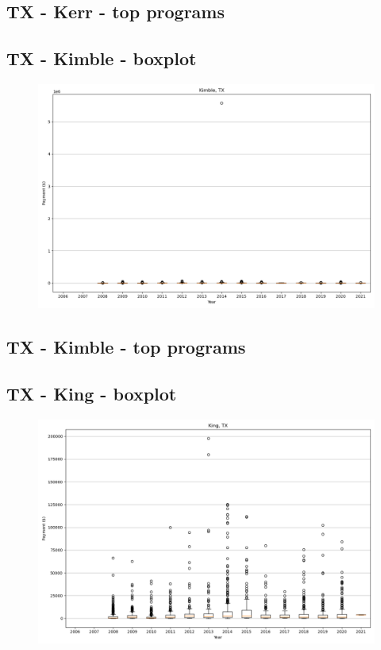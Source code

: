 \subsection*{TX - Kerr - top programs}

\newpage
\subsection*{TX - Kimble - boxplot}
\begin{figure}[h]
\centering
\includegraphics[width=7in]{../output/boxplots/counties/Kimble-TX_boxplot.png}
\end{figure}


\subsection*{TX - Kimble - top programs}

\newpage
\subsection*{TX - King - boxplot}
\begin{figure}[h]
\centering
\includegraphics[width=7in]{../output/boxplots/counties/King-TX_boxplot.png}
\end{figure}


